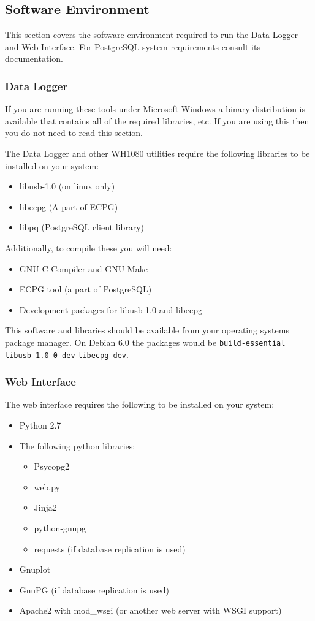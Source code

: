 \documentclass[a4paper,10pt,draft]{book}
\begin{document}
\subsection{Software Environment}
This section covers the software environment required to run the Data Logger and Web Interface. For PostgreSQL system requirements consult its documentation.

\subsubsection{Data Logger}

If you are running these tools under Microsoft Windows a binary distribution is available that contains all of the required libraries, etc. If you are using this then you do not need to read this section.

The Data Logger and other WH1080 utilities require the following libraries to be installed on your system:
\begin{itemize}
\item libusb-1.0 (on linux only)
\item libecpg (A part of ECPG)
\item libpq (PostgreSQL client library)
\end{itemize}

Additionally, to compile these you will need:
\begin{itemize}
\item GNU C Compiler and GNU Make
\item ECPG tool (a part of PostgreSQL)
\item Development packages for libusb-1.0 and libecpg
\end{itemize}

This software and libraries should be available from your operating systems package manager. On Debian 6.0 the packages would be \verb|build-essential| \verb|libusb-1.0-0-dev| \verb|libecpg-dev|.

\subsubsection{Web Interface}
The web interface requires the following to be installed on your system:
\begin{itemize}
\item Python 2.7
\item The following python libraries: 
\begin{itemize}
\item Psycopg2
\item web.py
\item Jinja2
\item python-gnupg
\item requests (if database replication is used)
\end{itemize}
\item Gnuplot
\item GnuPG (if database replication is used)
\item Apache2 with mod\_wsgi (or another web server with WSGI support)
\end{itemize}
\end{document}
